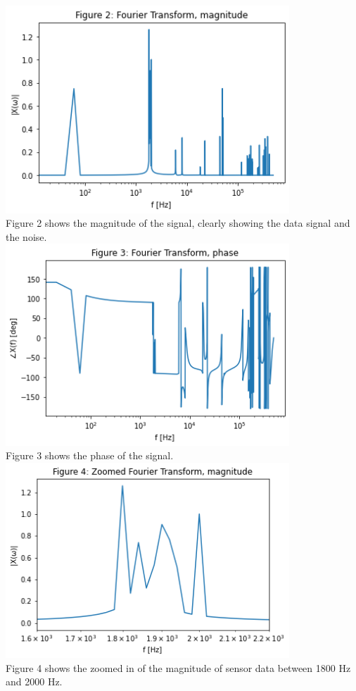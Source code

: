\documentclass[12pt,a4paper]{article}
\begin{document}
\includegraphics[width=0.8\textwidth]{Figure 2.png}\\
Figure 2 shows the magnitude of the signal, clearly showing the data signal and the noise.\\


\includegraphics[width=0.8\textwidth]{Figure 3.png}\\
Figure 3 shows the phase of the signal.\\

\includegraphics[width=0.8\textwidth]{Figure 4.png}\\
Figure 4 shows the zoomed in of the magnitude of sensor data between 1800 Hz and 2000 Hz.\\
\end{document}
